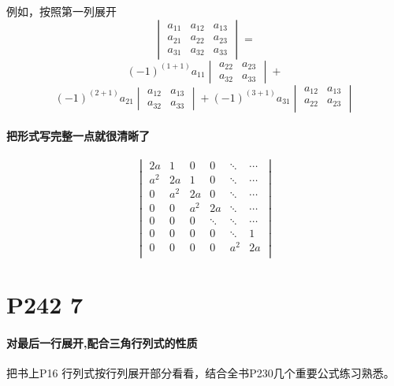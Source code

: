 \documentclass[a4paper]{ctexart}
\begin{document}
\begin{multicols}{2}
例如，按照第一列展开
$$
\begin{vmatrix}
a_{11}    &   a_{12}    &   a_{13}\\
a_{21}    &   a_{22}    &   a_{23}\\
a_{31}    &   a_{32}    &   a_{33}
\end{vmatrix}
=
$$
$$
(-1)^{(1+1)}a_{11}
\begin{vmatrix}
   a_{22}    &   a_{23}\\
   a_{32}    &   a_{33}
\end{vmatrix}
+
$$
$$
(-1)^{(2+1)}a_{21}
\begin{vmatrix}
   a_{12}    &   a_{13}\\
   a_{32}    &   a_{33}
\end{vmatrix}
+
(-1)^{(3+1)}a_{31}
\begin{vmatrix}
   a_{12}    &   a_{13}\\
   a_{22}    &   a_{23}\\
\end{vmatrix}
$$
\paragraph{把形式写完整一点就很清晰了}
$$
\begin{vmatrix}
2a  &   1   &   0   &   0       &       \ddots  &   \cdots\\
a^2 &   2a  &   1   &   0       &       \ddots  &   \cdots\\
0   &   a^2 &   2a  &   0       &       \ddots  &   \cdots\\
0   &   0   &   a^2 &   2a      &       \ddots  &   \cdots\\
0   &   0   &   0   &   \ddots  &       \ddots  &   \cdots\\
0   &   0   &   0   &   0       &       \ddots  &   1\\ 
0   &   0   &   0   &   0       &       a^2     &   2a\\ 
\end{vmatrix}
$$

\section{P242 7}
\paragraph{对最后一行展开,配合三角行列式的性质}
把书上P16 行列式按行列展开部分看看，结合全书P230几个重要公式练习熟悉。


\end{multicols}
\end{document}
